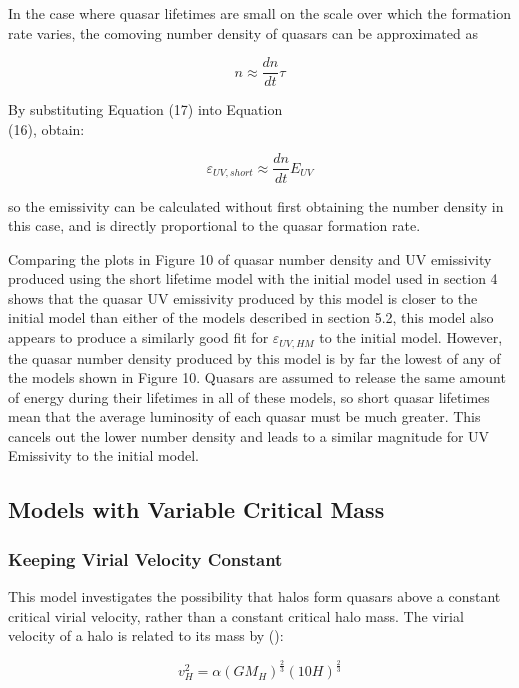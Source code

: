 \documentclass[12pt]{article}%
\begin{document}
In the case where quasar lifetimes are small on the scale over which the formation rate varies, the comoving number density of quasars can be approximated as

\begin{equation}
    n\approx\frac{dn}{dt}\tau
\end{equation}

\noindent By substituting Equation (17) into Equation\\(16), obtain:

\begin{equation}
    \varepsilon_{UV,short}\approx\frac{dn}{dt}E_{UV}
\end{equation}

\noindent so the emissivity can be calculated without first obtaining the number density in this case, and is directly proportional to the quasar formation rate.\par

Comparing the plots in Figure 10 of quasar number density and UV emissivity produced using the short lifetime model with the initial model used in section 4 shows that the quasar UV emissivity produced by this model is closer to the initial model than either of the models described in section 5.2, this model also appears to produce a similarly good fit for $\varepsilon_{UV,HM}$ to the initial model. However, the quasar number density produced by this model is by far the lowest of any of the models shown in Figure 10. Quasars are assumed to release the same amount of energy during their lifetimes in all of these models, so short quasar lifetimes mean that the average luminosity of each quasar must be much greater. This cancels out the lower number density and leads to a similar magnitude for UV Emissivity to the initial model.

\subsection{Models with Variable Critical Mass}
\subsubsection{Keeping Virial Velocity Constant}

This model investigates the possibility that halos form quasars above a constant critical virial velocity, rather than a constant critical halo mass. The virial velocity of a halo is related to its mass by (\cite{Ikea}):

\begin{equation}
    v_H^2=\alpha(GM_H)^{\frac{2}{3}}(10H)^{\frac{2}{3}}
\end{equation}
\end{document}
